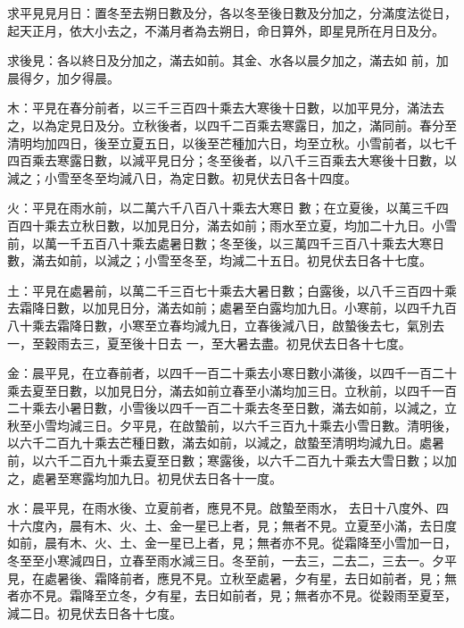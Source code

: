 \begin{pinyinscope}
 求平見見月日：置冬至去朔日數及分，各以冬至後日數及分加之，分滿度法從日，起天正月，依大小去之，不滿月者為去朔日，命日算外，即星見所在月日及分。



 求後見：各以終日及分加之，滿去如前。其金、水各以晨夕加之，滿去如
 前，加晨得夕，加夕得晨。



 木：平見在春分前者，以三千三百四十乘去大寒後十日數，以加平見分，滿法去之，以為定見日及分。立秋後者，以四千二百乘去寒露日，加之，滿同前。春分至清明均加四日，後至立夏五日，以後至芒種加六日，均至立秋。小雪前者，以七千四百乘去寒露日數，以減平見日分；冬至後者，以八千三百乘去大寒後十日數，以減之；小雪至冬至均減八日，為定日數。初見伏去日各十四度。



 火：平見在雨水前，以二萬六千八百八十乘去大寒日
 數；在立夏後，以萬三千四百四十乘去立秋日數，以加見日分，滿去如前；雨水至立夏，均加二十九日。小雪前，以萬一千五百八十乘去處暑日數；冬至後，以三萬四千三百八十乘去大寒日數，滿去如前，以減之；小雪至冬至，均減二十五日。初見伏去日各十七度。



 土：平見在處暑前，以萬二千三百七十乘去大暑日數；白露後，以八千三百四十乘去霜降日數，以加見日分，滿去如前；處暑至白露均加九日。小寒前，以四千九百八十乘去霜降日數，小寒至立春均減九日，立春後減八日，啟蟄後去七，氣別去一，至穀雨去三，夏至後十日去
 一，至大暑去盡。初見伏去日各十七度。



 金：晨平見，在立春前者，以四千一百二十乘去小寒日數小滿後，以四千一百二十乘去夏至日數，以加見日分，滿去如前立春至小滿均加三日。立秋前，以四千一百二十乘去小暑日數，小雪後以四千一百二十乘去冬至日數，滿去如前，以減之，立秋至小雪均減三日。夕平見，在啟蟄前，以六千三百九十乘去小雪日數。清明後，以六千二百九十乘去芒種日數，滿去如前，以減之，啟蟄至清明均減九日。處暑前，以六千二百九十乘去夏至日數；寒露後，以六千二百九十乘去大雪日數；以加之，處暑至寒露均加九日。初見伏去日各十一度。



 水：晨平見，在雨水後、立夏前者，應見不見。啟蟄至雨水，
 去日十八度外、四十六度內，晨有木、火、土、金一星已上者，見；無者不見。立夏至小滿，去日度如前，晨有木、火、土、金一星已上者，見；無者亦不見。從霜降至小雪加一日，冬至至小寒減四日，立春至雨水減三日。冬至前，一去三，二去二，三去一。夕平見，在處暑後、霜降前者，應見不見。立秋至處暑，夕有星，去日如前者，見；無者亦不見。霜降至立冬，夕有星，去日如前者，見；無者亦不見。從穀雨至夏至，減二日。初見伏去日各十七度。




\end{pinyinscope}
